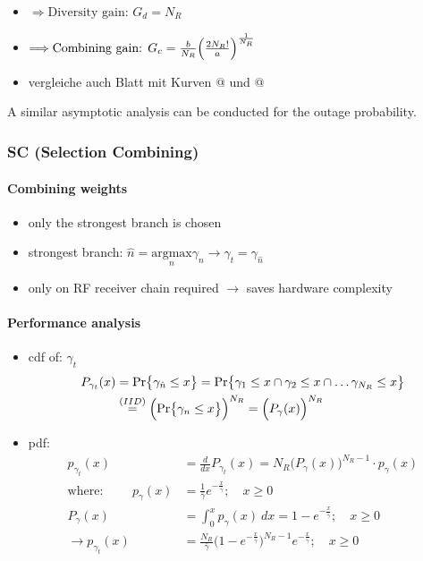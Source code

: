 \documentclass[a4paper, 10pt]{article}
\makeatletter
\newcommand{\Rmnum}[1]{\expandafter\@slowromancap\romannumeral #1@}
\makeatother
\begin{document}
\begin{itemize}
\begin{itemize}
		\item[] $\Longrightarrow \text{Diversity gain: } G_d = N_R$
		\item[] $\Longrightarrow \text{Combining gain: } G_c = \frac{b}{N_R}\Bigl( \frac{2N_R!}{a}\Bigr)^{\frac{1}{N_R}}$
		\item[] vergleiche auch Blatt mit Kurven \Rmnum{3} und \Rmnum{4}
	\end{itemize}
\end{itemize}
A similar asymptotic analysis can be conducted for the outage probability.
\subsubsection{SC (Selection Combining)}
\paragraph{Combining weights}
	\begin{itemize}
		\item only the strongest branch is chosen
		\item strongest branch: $\hat{n} = \underset{n}{\text{argmax}} \gamma _n \longrightarrow \gamma _t = \gamma _{\hat{n}}$
		\item only on RF receiver chain required $\rightarrow$\; saves hardware complexity 
	\end{itemize}
\paragraph{Performance analysis}
	\begin{itemize}
		\item cdf of: $\gamma _t$
			\begin{align*}
				P_{\gamma _t}(x) &= \text{Pr}\bigl\{\gamma _{\hat{n}} \leq x\bigr\} = \text{Pr}\bigl\{\gamma _1 \leq x \cap \gamma _2 \leq x \cap \dots \gamma _{N_R} \leq x\bigr\}\\
				&\overset{(IID)}{=} \Bigl(\text{Pr}\bigl\{\gamma _n \leq x\bigr\}\Bigr)^{N_R} = \Bigl( P_{\gamma}(x)\Bigr)^{N_R}
			\end{align*}
		\item pdf:
			\begin{align*}
				p_{\gamma _t}(x) &= \frac{d}{dx}P_{\gamma _t}(x) = N_R\bigl(P_{\gamma}(x)\bigr)^{N_R-1}\cdot p_{\gamma}(x)\\
				\text{where: }\qquad p_{\gamma} (x) &= \frac{1}{\bar{\gamma}}e^{-\frac{x}{\bar{\gamma}}};\quad x\geq 0\\
				P_{\gamma}(x) &= \int_{0}^{x}p_{\gamma}(x)~dx = 1 - e^{-\frac{x}{\bar{\gamma}}};\quad x\geq 0\\
				\rightarrow p_{\gamma _t}(x) &= \frac{N_R}{\bar{\gamma}}\bigl( 1 - e^{-\frac{x}{\bar{\gamma}}}\bigr)^{N_R-1}e^{-\frac{x}{\bar{\gamma}}};\quad x\geq 0
			\end{align*}
	\end{itemize}
\end{document}
